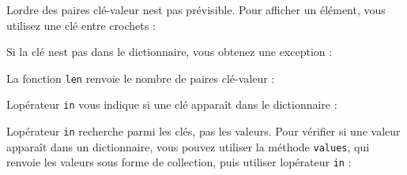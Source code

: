 L\textquotesingle ordre des paires clé-valeur n\textquotesingle est pas
prévisible. Pour afficher un élément, vous utilisez une clé entre
crochets :

\begin{Shaded}
\begin{Highlighting}[]
\OperatorTok{\textgreater{}\textgreater{}\textgreater{}} \NormalTok{(eng2fr[}\NormalTok{])}
\end{Highlighting}
\end{Shaded}

Si la clé n\textquotesingle est pas dans le dictionnaire, vous obtenez
une exception :

\begin{Shaded}
\begin{Highlighting}[]
\OperatorTok{\textgreater{}\textgreater{}\textgreater{}} \NormalTok{(eng2fr[}\NormalTok{])}
\NormalTok{: }
\end{Highlighting}
\end{Shaded}

La fonction \texttt{len} renvoie le nombre de paires clé-valeur :

\begin{Shaded}
\begin{Highlighting}[]
\OperatorTok{\textgreater{}\textgreater{}\textgreater{}} 
\end{Highlighting}
\end{Shaded}

L\textquotesingle opérateur \texttt{in} vous indique si une clé apparaît
dans le dictionnaire :

\begin{Shaded}
\begin{Highlighting}[]
\OperatorTok{\textgreater{}\textgreater{}\textgreater{}}  
\OperatorTok{\textgreater{}\textgreater{}\textgreater{}}  
\end{Highlighting}
\end{Shaded}

L\textquotesingle opérateur \texttt{in} recherche parmi les clés, pas
les valeurs. Pour vérifier si une valeur apparaît dans un dictionnaire,
vous pouvez utiliser la méthode \texttt{values}, qui renvoie les valeurs
sous forme de collection, puis utiliser l\textquotesingle opérateur
\texttt{in} :

